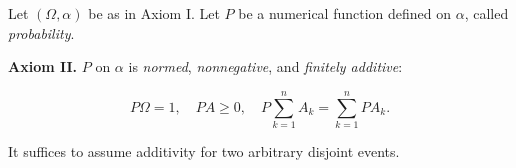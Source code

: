 Let $(\Omega, \alpha)$ be as in Axiom I. Let $P$ be a numerical function defined on $\alpha$, called \textit{probability}.

\textbf{Axiom II.} $P$ on $\alpha$ is \textit{normed}, \textit{nonnegative}, and \textit{finitely additive}:

$$P\Omega = 1, \quad PA \geq 0, \quad P \sum_{k=1}^{n} A_k = \sum_{k=1}^{n} PA_k.$$

It suffices to assume additivity for two arbitrary disjoint events.
